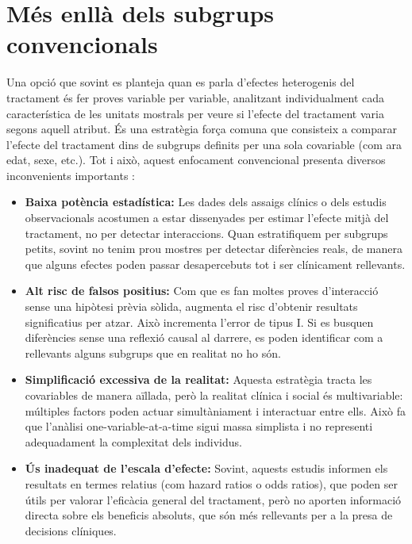 \documentclass[../main.tex]{subfiles}
\begin{document}
    \section{Més enllà dels subgrups convencionals} \label{sec:subconven}
    Una opció que sovint es planteja quan es parla d’efectes heterogenis del tractament és fer proves variable per variable, analitzant individualment cada característica de les unitats mostrals per veure si l’efecte del tractament varia segons aquell atribut. És una estratègia força comuna que consisteix a comparar l’efecte del tractament dins de subgrups definits per una sola covariable (com ara edat, sexe, etc.). Tot i això, aquest enfocament convencional presenta diversos inconvenients importants \citep{Kent2018}:
    \begin{itemize}
        \item \textbf{Baixa potència estadística:} Les dades dels assaigs clínics o dels estudis observacionals acostumen a estar dissenyades per estimar l’efecte mitjà del tractament, no per detectar interaccions. Quan estratifiquem per subgrups petits, sovint no tenim prou mostres per detectar diferències reals, de manera que alguns efectes poden passar desapercebuts tot i ser clínicament rellevants.
        \item \textbf{Alt risc de falsos positius:} Com que es fan moltes proves d’interacció sense una hipòtesi prèvia sòlida, augmenta el risc d’obtenir resultats significatius per atzar. Això incrementa l’error de tipus I. Si es busquen diferències sense una reflexió causal al darrere, es poden identificar com a rellevants alguns subgrups que en realitat no ho són.
        \item \textbf{Simplificació excessiva de la realitat:} Aquesta estratègia tracta les covariables de manera aïllada, però la realitat clínica i social és multivariable: múltiples factors poden actuar simultàniament i interactuar entre ells. Això fa que l’anàlisi one-variable-at-a-time sigui massa simplista i no representi adequadament la complexitat dels individus.
        \item \textbf{Ús inadequat de l’escala d’efecte:} Sovint, aquests estudis informen els resultats en termes relatius (com hazard ratios o odds ratios), que poden ser útils per valorar l’eficàcia general del tractament, però no aporten informació directa sobre els beneficis absoluts, que són més rellevants per a la presa de decisions clíniques.
    \end{itemize}
\end{document}
